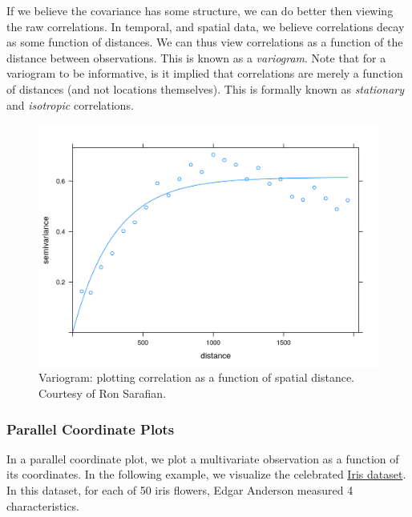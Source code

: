 \documentclass[]{book}
\newenvironment{Shaded}{\begin{snugshade}}{\end{snugshade}}
\newcommand{\KeywordTok}[1]{\textcolor[rgb]{0.13,0.29,0.53}{\textbf{#1}}}
\newcommand{\DataTypeTok}[1]{\textcolor[rgb]{0.13,0.29,0.53}{#1}}
\newcommand{\DecValTok}[1]{\textcolor[rgb]{0.00,0.00,0.81}{#1}}
\newcommand{\StringTok}[1]{\textcolor[rgb]{0.31,0.60,0.02}{#1}}
\newcommand{\OperatorTok}[1]{\textcolor[rgb]{0.81,0.36,0.00}{\textbf{#1}}}
\newcommand{\NormalTok}[1]{#1}
\theoremstyle{definition}
\theoremstyle{definition}
\theoremstyle{definition}
\theoremstyle{remark}
\begin{document}
If we believe the covariance has some structure, we can do better then
viewing the raw correlations. In temporal, and spatial data, we believe
correlations decay as some function of distances. We can thus view
correlations as a function of the distance between observations. This is
known as a \emph{variogram}. Note that for a variogram to be
informative, is it implied that correlations are merely a function of
distances (and not locations themselves). This is formally known as
\emph{stationary} and \emph{isotropic} correlations.

\begin{figure}
\centering
\includegraphics{art/variogram.png}
\caption{Variogram: plotting correlation as a function of spatial
distance. Courtesy of Ron Sarafian.}
\end{figure}

\hypertarget{parcoord}{\subsubsection{Parallel Coordinate
Plots}\label{parcoord}}

In a parallel coordinate plot, we plot a multivariate observation as a
function of its coordinates. In the following example, we visualize the
celebrated
\href{https://en.wikipedia.org/wiki/Iris_flower_data_set}{Iris dataset}.
In this dataset, for each of 50 iris flowers, Edgar Anderson measured 4
characteristics.

\begin{Shaded}
\end{Shaded}
\end{document}
